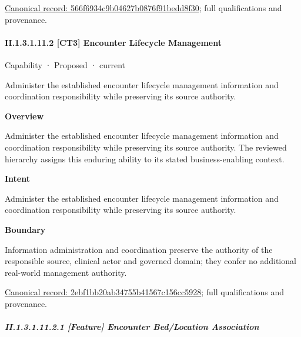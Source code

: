 {\footnotesize \href{../../../../../../../continuum/strategy/capability/feature/566f6934c9b04627b0876f91bedd8f30.md}{Canonical record: 566f6934c9b04627b0876f91bedd8f30}; full qualifications and provenance.}\par
\paragraph*{II.1.3.1.11.2 [CT3] Encounter Lifecycle Management}
\label{navigation:II.1.3.1.11.2}

\label{element:2ebf1bb20ab34755b41567c156cc5928}
{\small Capability · Proposed · current}\par

Administer the established encounter lifecycle management information and coordination responsibility while preserving its source authority.



\textbf{Overview}



Administer the established encounter lifecycle management information and coordination responsibility while preserving its source authority. The reviewed hierarchy assigns this enduring ability to its stated business-enabling context.



\textbf{Intent}



Administer the established encounter lifecycle management information and coordination responsibility while preserving its source authority.



\textbf{Boundary}



Information administration and coordination preserve the authority of the responsible source, clinical actor and governed domain; they confer no additional real-world management authority.


{\footnotesize \href{../../../../../../../continuum/strategy/capability/2ebf1bb20ab34755b41567c156cc5928.md}{Canonical record: 2ebf1bb20ab34755b41567c156cc5928}; full qualifications and provenance.}\par
\subparagraph*{II.1.3.1.11.2.1 [Feature] Encounter Bed/Location Association}
\label{navigation:II.1.3.1.11.2.1}

